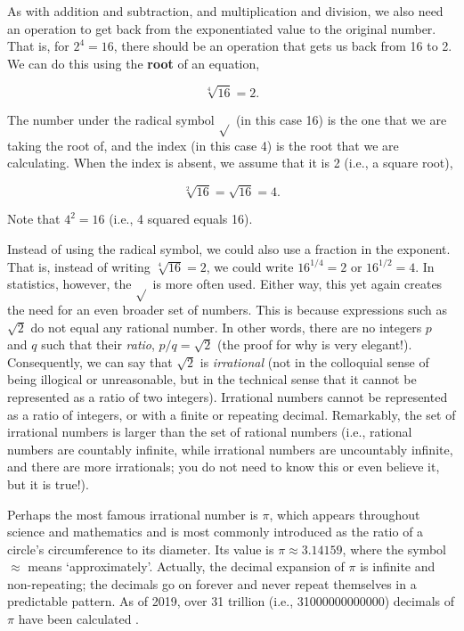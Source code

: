\documentclass[
  openany]{krantz}
\begin{document}
As with addition and subtraction, and multiplication and division, we also need an operation to get back from the exponentiated value to the original number.
That is, for \(2^{4} = 16\), there should be an operation that gets us back from 16 to 2.
We can do this using the \textbf{root} of an equation,

\[\sqrt[4]{16} = 2.\]

The number under the radical symbol \(\sqrt{}\) (in this case 16) is the one that we are taking the root of, and the index (in this case 4) is the root that we are calculating.
When the index is absent, we assume that it is 2 (i.e., a square root),

\[\sqrt[2]{16} = \sqrt{16} = 4.\]

Note that \(4^{2} = 16\) (i.e., 4 squared equals 16).

Instead of using the radical symbol, we could also use a fraction in the exponent.
That is, instead of writing \(\sqrt[4]{16} = 2\), we could write \(16^{1/4} = 2\) or \(16^{1/2} = 4\).
In statistics, however, the \(\sqrt{}\) is more often used.
Either way, this yet again creates the need for an even broader set of numbers.
This is because expressions such as \(\sqrt{2}\) do not equal any rational number.
In other words, there are no integers \(p\) and \(q\) such that their \emph{ratio}, \(p/q = \sqrt{2}\) (the proof for why is very elegant!).
Consequently, we can say that \(\sqrt{2}\) is \emph{irrational} (not in the colloquial sense of being illogical or unreasonable, but in the technical sense that it cannot be represented as a ratio of two integers).
Irrational numbers cannot be represented as a ratio of integers, or with a finite or repeating decimal.
Remarkably, the set of irrational numbers is larger than the set of rational numbers (i.e., rational numbers are countably infinite, while irrational numbers are uncountably infinite, and there are more irrationals; you do not need to know this or even believe it, but it is true!).

Perhaps the most famous irrational number is \(\pi\), which appears throughout science and mathematics and is most commonly introduced as the ratio of a circle's circumference to its diameter.
Its value is \(\pi \approx 3.14159\), where the symbol \(\approx\) means `approximately'.
Actually, the decimal expansion of \(\pi\) is infinite and non-repeating; the decimals go on forever and never repeat themselves in a predictable pattern.
As of 2019, over 31 trillion (i.e., 31000000000000) decimals of \(\pi\) have been calculated \citep{Yee2019}.
\end{document}
